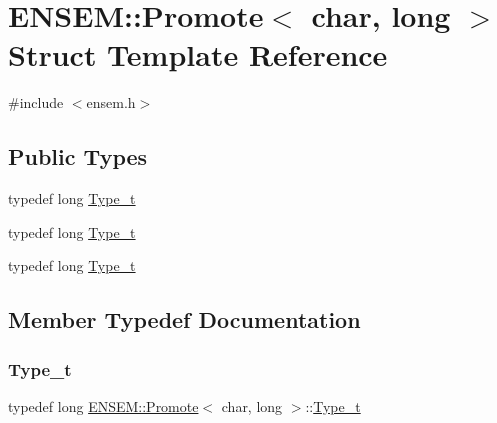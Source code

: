 \hypertarget{structENSEM_1_1Promote_3_01char_00_01long_01_4}{}\section{E\+N\+S\+EM\+:\+:Promote$<$ char, long $>$ Struct Template Reference}
\label{structENSEM_1_1Promote_3_01char_00_01long_01_4}


{\ttfamily \#include $<$ensem.\+h$>$}

\subsection*{Public Types}
\begin{DoxyCompactItemize}
\item 
typedef long \mbox{\hyperlink{structENSEM_1_1Promote_3_01char_00_01long_01_4_af2c2227ccd58ab5b06ad3e9b368ec6d3}{Type\+\_\+t}}
\item 
typedef long \mbox{\hyperlink{structENSEM_1_1Promote_3_01char_00_01long_01_4_af2c2227ccd58ab5b06ad3e9b368ec6d3}{Type\+\_\+t}}
\item 
typedef long \mbox{\hyperlink{structENSEM_1_1Promote_3_01char_00_01long_01_4_af2c2227ccd58ab5b06ad3e9b368ec6d3}{Type\+\_\+t}}
\end{DoxyCompactItemize}


\subsection{Member Typedef Documentation}
\mbox{\label{structENSEM_1_1Promote_3_01char_00_01long_01_4_af2c2227ccd58ab5b06ad3e9b368ec6d3}} 
\subsubsection{\texorpdfstring{Type\_t}{Type\_t}\hspace{0.1cm}{\footnotesize\ttfamily [1/3]}}
{\footnotesize\ttfamily typedef long \mbox{\hyperlink{structENSEM_1_1Promote}{E\+N\+S\+E\+M\+::\+Promote}}$<$ char, long $>$\+::\mbox{\hyperlink{structENSEM_1_1Promote_3_01char_00_01long_01_4_af2c2227ccd58ab5b06ad3e9b368ec6d3}{Type\+\_\+t}}}

\mbox{\label{structENSEM_1_1Promote_3_01char_00_01long_01_4_af2c2227ccd58ab5b06ad3e9b368ec6d3}} 
